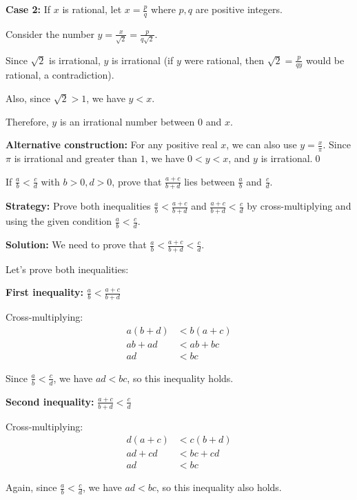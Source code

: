 \textbf{Case 2:} If $x$ is rational, let $x = \frac{p}{q}$ where $p, q$ are positive integers.

Consider the number $y = \frac{x}{\sqrt{2}} = \frac{p}{q\sqrt{2}}$.

Since $\sqrt{2}$ is irrational, $y$ is irrational (if $y$ were rational, then $\sqrt{2} = \frac{p}{qy}$ would be rational, a contradiction).

Also, since $\sqrt{2} > 1$, we have $y < x$.

Therefore, $y$ is an irrational number between $0$ and $x$.

\textbf{Alternative construction:}
For any positive real $x$, we can also use $y = \frac{x}{\pi}$. Since $\pi$ is irrational and greater than $1$, we have $0 < y < x$, and $y$ is irrational.\qed


\begin{problembox}
If $\frac{a}{b} < \frac{c}{d}$ with $b > 0, d > 0$, prove that $\frac{a + c}{b + d}$ lies between $\frac{a}{b}$ and $\frac{c}{d}$.
\end{problembox}

\noindent\textbf{Strategy:} Prove both inequalities $\frac{a}{b} < \frac{a + c}{b + d}$ and $\frac{a + c}{b + d} < \frac{c}{d}$ by cross-multiplying and using the given condition $\frac{a}{b} < \frac{c}{d}$.

\bigskip\noindent\textbf{Solution:}
We need to prove that $\frac{a}{b} < \frac{a + c}{b + d} < \frac{c}{d}$.

Let's prove both inequalities:

\textbf{First inequality:} $\frac{a}{b} < \frac{a + c}{b + d}$

Cross-multiplying:
\begin{align*}
a(b + d) &< b(a + c) \\
ab + ad &< ab + bc \\
ad &< bc
\end{align*}

Since $\frac{a}{b} < \frac{c}{d}$, we have $ad < bc$, so this inequality holds.

\textbf{Second inequality:} $\frac{a + c}{b + d} < \frac{c}{d}$

Cross-multiplying:
\begin{align*}
d(a + c) &< c(b + d) \\
ad + cd &< bc + cd \\
ad &< bc
\end{align*}

Again, since $\frac{a}{b} < \frac{c}{d}$, we have $ad < bc$, so this inequality also holds.

